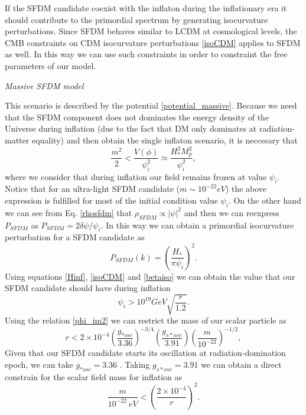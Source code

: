 \documentclass[amssymb,twocolumn,prd,nofootinbib,showpacs]{revtex4-1}
\begin{document}
If the SFDM candidate coexist with the inflaton during the inflationary era it should contribute to the primordial spectrum by generating isocurvature perturbations. Since SFDM behaves similar to LCDM at cosmological levels, the CMB constraints on CDM isocurvature perturbations \eqref{isoCDM} applies to SFDM as well. In this way we can use such constraints in order to constraint the free parameters of our model.
\begin{center}
\textit{Massive SFDM model}
\end{center}

This scenario is described by the potential \eqref{potential_massive}. Because we need that the SFDM component does not dominates the energy density of the Universe during inflation (due to the fact that DM only dominates at radiation-matter equality) and then obtain the single inflaton scenario, it is neccesary that 
\begin{equation}
\frac{m^2}{2} < \frac{V(\phi)}{\psi_i^2}\simeq \frac{H^2_{*}M_p^2}{\psi_i^2},
\end{equation}
where we consider that during inflation our field remains frozen  at value $\psi_i$. Notice that for an ultra-light SFDM candidate  ($m\sim 10^{-22}eV$) the above expression is fulfilled for most of the initial condition value $\psi_i$. On the other hand we can see from Eq. \eqref{rhosfdm} that $\rho_{SFDM}\propto |\psi|^2$ and then we can reexpress $P_{SFDM}$ as 
$P_{SFDM} = 2\delta \psi/\psi_i
$. In this way we can obtain a primordial isocurvature perturbation for a SFDM candidate as
\begin{equation}
P_{SFDM}(k)=\left(\frac{H_*}{\pi \psi_i}\right)^2.
\end{equation}
Using equations  \eqref{Hinf}, \eqref{isoCDM} and \eqref{betaiso} we can obtain the value that our SFDM candidate should have during inflation
\begin{equation}\label{initial_c}
\psi_i>10^{19}GeV\sqrt{\frac{r}{1.2}}.
\end{equation}
Using the relation \eqref{phi_im2} we can restrict the mass of our scalar particle as  
\begin{equation}
r<2\times 10^{-4}\left(\frac{g_{*osc}}{3.36}\right)^{-3/4}\left(\frac{g_{s*osc}}{3.91}\right)\left(\frac{m}{10^{-22}}\right)^{-1/2},
\end{equation}
Given that our SFDM candidate starts its oscillation at radiation-domination epoch, we can take $g_{*osc}=3.36$ \cite{effdeg}. Taking $g_{s*osc}=3.91$ we can obtain a direct constrain for the scalar field mass for inflation as 
\begin{equation}\label{constm}
\frac{m}{10^{-22}\ eV}<\left(\frac{2\times 10^{-4}}{r}\right)^2.
\end{equation}
\end{document}
